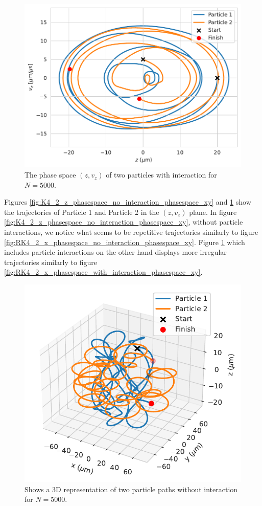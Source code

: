 \documentclass[english,notitlepage,reprint,nofootinbib]{revtex4-1}  %
\begin{document}
\begin{figure}[H]
    \centering
    \includegraphics[width=.5\textwidth]{../figures/phase_space_z_interaction_RK4_N5000.pdf}
    \caption{The phase space $(z, v_z)$ of two particles with interaction for $N = 5000$.}
    \label{fig:K4_2_z_phasespace_with_interaction_phasespace_xy}
\end{figure}
Figures \ref{fig:K4_2_z_phasespace_no_interaction_phasespace_xy} and \ref{fig:K4_2_z_phasespace_with_interaction_phasespace_xy}
show the trajectories of Particle 1 and Particle 2 in the $(z,v_z)$ plane. In figure \ref{fig:K4_2_z_phasespace_no_interaction_phasespace_xy},
without particle interactions, we notice what seems to be repetitive trajectories similarly to figure
\ref{fig:RK4_2_x_phasespace_no_interaction_phasespace_xy}. Figure \ref{fig:K4_2_z_phasespace_with_interaction_phasespace_xy}
which includes particle interactions on the other hand displays more irregular trajectories similarly to figure \ref{fig:RK4_2_x_phasespace_with_interaction_phasespace_xy}.

\begin{figure}[H]
    \centering
    \includegraphics[width=.5\textwidth]{../figures/3D_2_particles_RK4_N5000.pdf}
    \caption{Shows a 3D representation of two particle paths without interaction for $N = 5000$.}
    \label{fig:3D_2_particles_no_interaction}
\end{figure}
\end{document}
